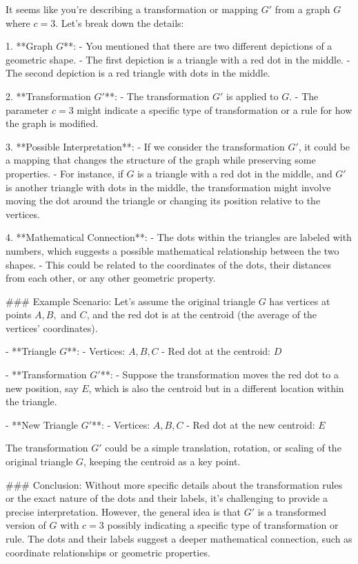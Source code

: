 It seems like you're describing a transformation or mapping \( G' \) from a graph \( G \) where \( c = 3 \). Let's break down the details:

1. **Graph \( G \)**:
   - You mentioned that there are two different depictions of a geometric shape.
   - The first depiction is a triangle with a red dot in the middle.
   - The second depiction is a red triangle with dots in the middle.

2. **Transformation \( G' \)**:
   - The transformation \( G' \) is applied to \( G \).
   - The parameter \( c = 3 \) might indicate a specific type of transformation or a rule for how the graph is modified.

3. **Possible Interpretation**:
   - If we consider the transformation \( G' \), it could be a mapping that changes the structure of the graph while preserving some properties.
   - For instance, if \( G \) is a triangle with a red dot in the middle, and \( G' \) is another triangle with dots in the middle, the transformation might involve moving the dot around the triangle or changing its position relative to the vertices.

4. **Mathematical Connection**:
   - The dots within the triangles are labeled with numbers, which suggests a possible mathematical relationship between the two shapes.
   - This could be related to the coordinates of the dots, their distances from each other, or any other geometric property.

### Example Scenario:
Let's assume the original triangle \( G \) has vertices at points \( A, B, \) and \( C \), and the red dot is at the centroid (the average of the vertices' coordinates).

- **Triangle \( G \)**:
  - Vertices: \( A, B, C \)
  - Red dot at the centroid: \( D \)

- **Transformation \( G' \)**:
  - Suppose the transformation moves the red dot to a new position, say \( E \), which is also the centroid but in a different location within the triangle.

- **New Triangle \( G' \)**:
  - Vertices: \( A, B, C \)
  - Red dot at the new centroid: \( E \)

The transformation \( G' \) could be a simple translation, rotation, or scaling of the original triangle \( G \), keeping the centroid as a key point.

### Conclusion:
Without more specific details about the transformation rules or the exact nature of the dots and their labels, it's challenging to provide a precise interpretation. However, the general idea is that \( G' \) is a transformed version of \( G \) with \( c = 3 \) possibly indicating a specific type of transformation or rule. The dots and their labels suggest a deeper mathematical connection, such as coordinate relationships or geometric properties.